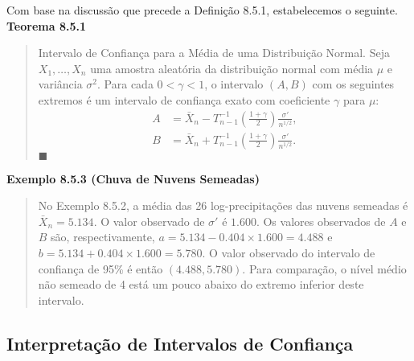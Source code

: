 Com base na discussão que precede a Definição 8.5.1, estabelecemos o seguinte.\vspace{1em}
\noindent\textbf{Teorema 8.5.1}
\begin{quote}
    Intervalo de Confiança para a Média de uma Distribuição Normal. Seja $X_1, \dots, X_n$ uma amostra aleatória da distribuição normal com média $\mu$ e variância $\sigma^2$. Para cada $0 < \gamma < 1$, o intervalo $(A, B)$ com os seguintes extremos é um intervalo de confiança exato com coeficiente $\gamma$ para $\mu$:
    \begin{align*}
        A &= \bar{X}_n - T_{n-1}^{-1}\left(\frac{1+\gamma}{2}\right) \frac{\sigma'}{n^{1/2}}, \\
        B &= \bar{X}_n + T_{n-1}^{-1}\left(\frac{1+\gamma}{2}\right) \frac{\sigma'}{n^{1/2}}.
    \end{align*}
\hfill $\blacksquare$
\end{quote}
\vspace{1em}

\vspace{1em}
\noindent\textbf{Exemplo 8.5.3 (Chuva de Nuvens Semeadas)}
\begin{quote}
    No Exemplo 8.5.2, a média das 26 log-precipitações das nuvens semeadas é $\bar{X}_n = 5.134$. O valor observado de $\sigma'$ é $1.600$. Os valores observados de $A$ e $B$ são, respectivamente, $a = 5.134 - 0.404 \times 1.600 = 4.488$ e $b = 5.134 + 0.404 \times 1.600 = 5.780$. O valor observado do intervalo de confiança de 95\% é então $(4.488, 5.780)$. Para comparação, o nível médio não semeado de 4 está um pouco abaixo do extremo inferior deste intervalo.
\end{quote}
\vspace{1em}

\subsection*{Interpretação de Intervalos de Confiança}


